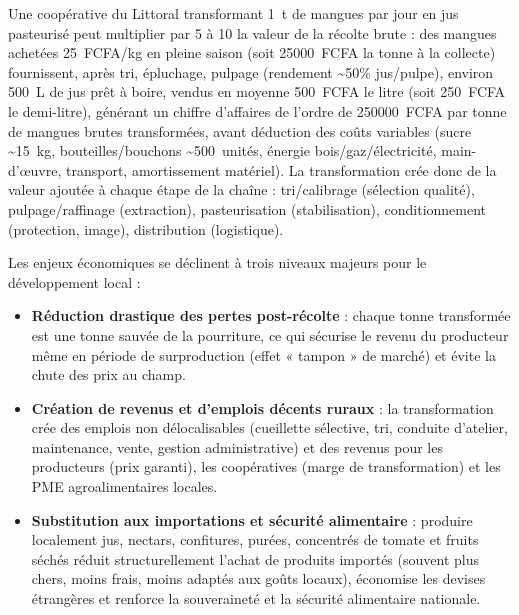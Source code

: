 \documentclass[11pt]{article}
\newcommand{\cle}[1]{{\popxbold\color{popdark}#1}}
\begin{document}
\begin{exemplebox}
Une coopérative du Littoral transformant \SI{1}{t} de mangues par jour en jus pasteurisé peut multiplier par 5 à 10 la valeur de la récolte brute : des mangues achetées \SI{25}{FCFA/kg} en pleine saison (soit \SI{25000}{FCFA} la tonne à la collecte) fournissent, après tri, épluchage, pulpage (rendement \textasciitilde 50\% jus/pulpe), environ \SI{500}{L} de jus prêt à boire, vendus en moyenne \SI{500}{FCFA} le litre (soit \SI{250}{FCFA} le demi-litre), générant un chiffre d'affaires de l'ordre de \SI{250000}{FCFA} par tonne de mangues brutes transformées, avant déduction des coûts variables (sucre \textasciitilde \SI{15}{kg}, bouteilles/bouchons \textasciitilde \SI{500}{unités}, énergie bois/gaz/électricité, main-d'œuvre, transport, amortissement matériel). La transformation crée donc de la \cle{valeur ajoutée} à chaque étape de la chaîne : tri/calibrage (sélection qualité), pulpage/raffinage (extraction), pasteurisation (stabilisation), conditionnement (protection, image), distribution (logistique).
\end{exemplebox}

Les enjeux économiques se déclinent à trois niveaux majeurs pour le développement local :
\begin{itemize}
\item \textbf{Réduction drastique des pertes post-récolte} : chaque tonne transformée est une tonne sauvée de la pourriture, ce qui sécurise le revenu du producteur même en période de surproduction (effet « tampon » de marché) et évite la chute des prix au champ.
\item \textbf{Création de revenus et d'emplois décents ruraux} : la transformation crée des emplois non délocalisables (cueillette sélective, tri, conduite d'atelier, maintenance, vente, gestion administrative) et des revenus pour les producteurs (prix garanti), les coopératives (marge de transformation) et les PME agroalimentaires locales.
\item \textbf{Substitution aux importations et sécurité alimentaire} : produire localement jus, nectars, confitures, purées, concentrés de tomate et fruits séchés réduit structurellement l'achat de produits importés (souvent plus chers, moins frais, moins adaptés aux goûts locaux), économise les devises étrangères et renforce la souveraineté et la sécurité alimentaire nationale.
\end{itemize}
\end{document}

